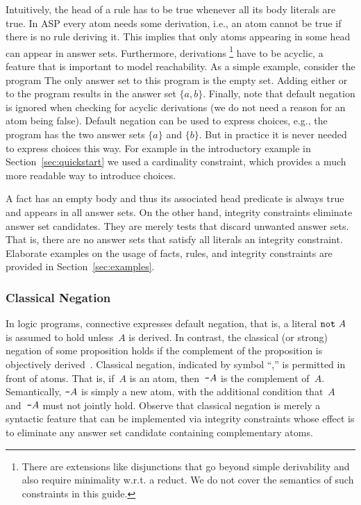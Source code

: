 Intuitively, the head of a rule has to be true whenever all its body literals are true.
In ASP every atom needs some derivation, i.e., 
an atom cannot be true if there is no rule deriving it.
This implies that only atoms appearing in some head can appear in answer sets.
Furthermore, derivations%
\footnote{There are extensions like disjunctions 
that go beyond simple derivability and also require minimality w.r.t. a reduct. 
We do not cover the semantics of such constraints in this guide.}%
have to be acyclic,
a feature that is important to model reachability.
As a simple example, consider the program 
The only answer set to this program is the empty set.
Adding either  or  to the program results in the answer set $\{a,b\}$.
Finally, note that default negation is ignored when checking for acyclic derivations 
(we do not need a reason for an atom being false).
Default negation can be used to express choices, e.g., the program  
has the two answer sets $\{a\}$ and $\{b\}$.
But in practice it is never needed to express choices this way.
For example in the introductory example in Section~\ref{sec:quickstart} we used a cardinality 
constraint, which provides a much more readable way to introduce choices.

A fact has an empty body and thus its associated head predicate is always true 
and appears in all answer sets.
On the other hand, integrity constraints eliminate answer set candidates.
They are merely tests that discard unwanted answer sets.
That is, there are no answer sets that satisfy all literals an integrity constraint.
Elaborate examples on the usage of facts, rules, and integrity constraints
are provided in Section~\ref{sec:examples}.

\subsubsection{Classical Negation}\label{subsec:gringo:negation}

In logic programs, connective  expresses default negation,
that is, a literal $\texttt{not}~A$ is assumed to hold unless~$A$ is derived.
In contrast, the classical (or strong) negation of some proposition
holds if the complement of the proposition is objectively derived~\cite{gellif91a}.
Classical negation, indicated by symbol ``\code{-},'' is permitted in front of atoms.
That is, if~$A$ is an atom, then~$\texttt{-}A$ is the complement of~$A$.
Semantically, $\texttt{-}A$ is simply a new atom,
with the additional condition that~$A$ and~$\texttt{-}A$ must not jointly hold.
Observe that classical negation is merely a syntactic feature that can be
implemented via integrity constraints whose effect is to eliminate
any answer set candidate containing complementary atoms.

